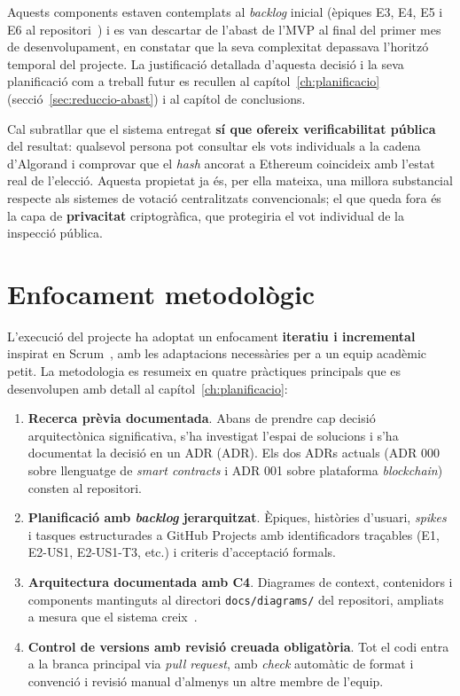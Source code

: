 Aquests components estaven contemplats al \emph{backlog} inicial (èpiques E3, E4, E5 i E6 al
repositori~\cite{demochainrepo}) i es van descartar de l'abast de l'\ac{MVP} al final del primer mes de desenvolupament,
en constatar que la seva complexitat depassava l'horitzó temporal del projecte.
La justificació detallada d'aquesta decisió i la seva planificació com a treball futur es recullen al
capítol~\ref{ch:planificacio} (secció~\ref{sec:reduccio-abast}) i al capítol de conclusions.

Cal subratllar que el sistema entregat \textbf{sí que ofereix verificabilitat pública} del resultat: qualsevol persona
pot consultar els vots individuals a la cadena d'Algorand i comprovar que el \emph{\textit{hash}} ancorat a Ethereum
coincideix amb l'estat real de l'elecció.
Aquesta propietat ja és, per ella mateixa, una millora substancial respecte als sistemes de votació centralitzats
convencionals; el que queda fora és la capa de \textbf{privacitat} criptogràfica, que protegiria el vot individual de la
inspecció pública.



\section{Enfocament metodològic}
\label{sec:metodologia}

L'execució del projecte ha adoptat un enfocament \textbf{iteratiu i incremental} inspirat en
Scrum~\cite{schwaber2020scrum}, amb les adaptacions necessàries per a un equip acadèmic petit.
La metodologia es resumeix en quatre pràctiques principals que es desenvolupen amb detall al
capítol~\ref{ch:planificacio}:

\begin{enumerate}
    \item \textbf{Recerca prèvia documentada}.
    Abans de prendre cap decisió arquitectònica significativa, s'ha investigat l'espai de solucions i s'ha documentat la
    decisió en un \acl{ADR} (\ac{ADR}).
    Els dos \acp{ADR} actuals (\acl{ADR} 000 sobre llenguatge de \emph{smart contracts} i \acl{ADR} 001 sobre plataforma
    \emph{blockchain}) consten al repositori.

    \item \textbf{Planificació amb \emph{backlog} jerarquitzat}.
    Èpiques, històries d'usuari, \emph{spikes} i tasques estructurades a GitHub Projects amb identificadors traçables
    (E1, E2-\ac{US}1, E2-\ac{US}1-T3, etc.) i criteris d'acceptació formals.

    \item \textbf{Arquitectura documentada amb C4}.
    Diagrames de context, contenidors i components mantinguts al directori \texttt{docs/diagrams/} del repositori,
    ampliats a mesura que el sistema creix~\cite{brown2018c4}.

    \item \textbf{Control de versions amb revisió creuada obligatòria}.
    Tot el codi entra a la branca principal via \emph{pull request}, amb \emph{check} automàtic de format i convenció i
    revisió manual d'almenys un altre membre de l'equip.
\end{enumerate}

